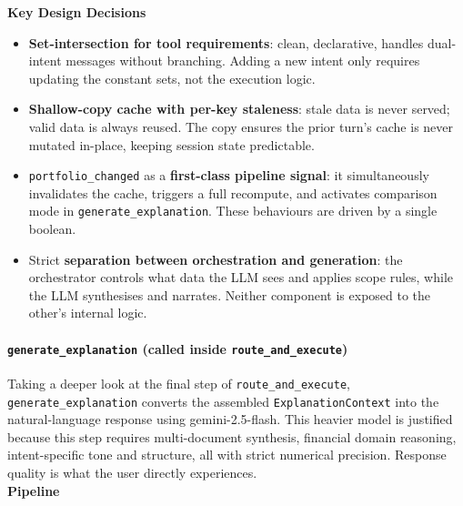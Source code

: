 \textbf{Key Design Decisions}
\begin{itemize}
    \item \textbf{Set-intersection for tool requirements}: clean, declarative, handles dual-intent messages without branching. Adding a new intent only requires updating the constant sets, not the execution logic.
    \item \textbf{Shallow-copy cache with per-key staleness}: stale data is never served; valid data is always reused. The copy ensures the prior turn's cache is never mutated in-place, keeping session state predictable.
    \item \texttt{portfolio\_changed} as a \textbf{first-class pipeline signal}: it simultaneously invalidates the cache, triggers a full recompute, and activates comparison mode in \texttt{generate\_explanation}. These behaviours are driven by a single boolean.
    \item Strict \textbf{separation between orchestration and generation}: the orchestrator controls what data the LLM sees and applies scope rules, while the LLM synthesises and narrates. Neither component is exposed to the other's internal logic.

\end{itemize}

\paragraph{\texttt{generate\_explanation} (called inside \texttt{route\_and\_execute})}

Taking a deeper look at the final step of \texttt{route\_and\_execute}, \texttt{generate\_explanation} converts the assembled \texttt{ExplanationContext} into the natural-language response using gemini-2.5-flash. This heavier model is justified because this step requires multi-document synthesis, financial domain reasoning, intent-specific tone and structure, all with strict numerical precision. Response quality is what the user directly experiences.\\

\textbf{Pipeline}

